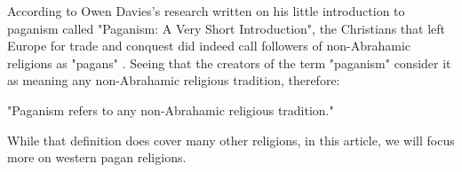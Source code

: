 According to Owen Davies's research written on his little introduction to paganism called "Paganism:
A Very Short Introduction", the Christians that left Europe for trade and conquest did indeed call
followers of non-Abrahamic religions as "pagans" \cite{Davies2011}. Seeing that the creators of the term
"paganism" consider it as meaning any non-Abrahamic religious tradition, therefore:

\begin{center}
    \itshape
    \parbox{0.7\textwidth}{
    "Paganism refers to any non-Abrahamic religious tradition."
    }
\end{center}

While that definition does cover many other religions, in this article, we will focus more on western
pagan religions.